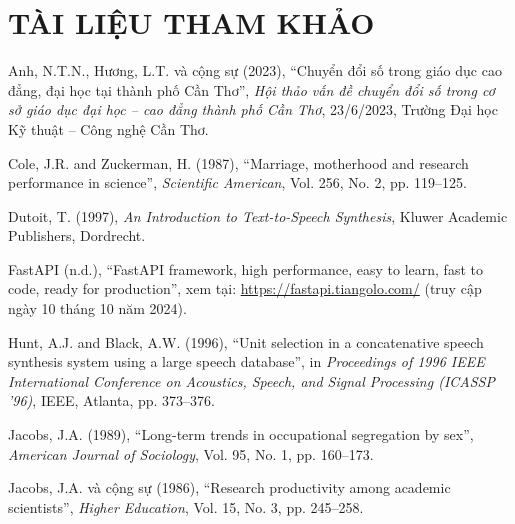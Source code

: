 \section*{TÀI LIỆU THAM KHẢO}

\begin{list}{}{%
  \sloppy
  \setlength{\leftmargin}{2.0cm}%
  \setlength{\itemindent}{-0.73cm}%
  \setlength{\parsep}{6pt}%
  \setlength{\itemsep}{6pt}%
  \setlength{\topsep}{6pt}%
}

\item Anh, N.T.N., Hương, L.T. và cộng sự (2023), ``Chuyển đổi số trong giáo dục cao đẳng, đại học tại thành phố Cần Thơ'', \textit{Hội thảo vấn đề chuyển đổi số trong cơ sở giáo dục đại học -- cao đẳng thành phố Cần Thơ}, 23/6/2023, Trường Đại học Kỹ thuật -- Công nghệ Cần Thơ.

\item Cole, J.R. and Zuckerman, H. (1987), ``Marriage, motherhood and research performance in science'', \textit{Scientific American}, Vol. 256, No. 2, pp. 119--125.

\item Dutoit, T. (1997), \textit{An Introduction to Text-to-Speech Synthesis}, Kluwer Academic Publishers, Dordrecht.

\item FastAPI (n.d.), ``FastAPI framework, high performance, easy to learn, fast to code, ready for production'', xem tại: \url{https://fastapi.tiangolo.com/} (truy cập ngày 10 tháng 10 năm 2024).

\item Hunt, A.J. and Black, A.W. (1996), ``Unit selection in a concatenative speech synthesis system using a large speech database'', in \textit{Proceedings of 1996 IEEE International Conference on Acoustics, Speech, and Signal Processing (ICASSP '96)}, IEEE, Atlanta, pp. 373--376.

\item Jacobs, J.A. (1989), ``Long-term trends in occupational segregation by sex'', \textit{American Journal of Sociology}, Vol. 95, No. 1, pp. 160--173.

\item Jacobs, J.A. và cộng sự (1986), ``Research productivity among academic scientists'', \textit{Higher Education}, Vol. 15, No. 3, pp. 245--258.


\end{list}
